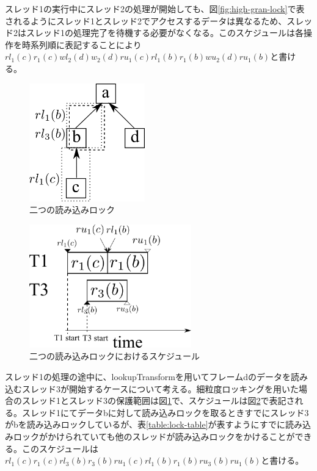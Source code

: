 \documentclass[a4paper]{jreport}	%
\begin{document}
スレッド1の実行中にスレッド2の処理が開始しても、図\ref{fig:high-gran-lock}で表されるようにスレッド1とスレッド2でアクセスするデータは異なるため、スレッド2はスレッド1の処理完了を待機する必要がなくなる。このスケジュールは各操作を時系列順に表記することにより$rl_1(c)r_1(c)wl_2(d)w_2(d)ru_1(c)rl_1(b)r_1(b)wu_2(d)ru_1(b)$と書ける。


\begin{figure}[h] 
\centering
\includegraphics[width=5cm]{two-read-lock}
\caption{二つの読み込みロック}
\label{fig:two-read-lock}
\end{figure}


\begin{figure}[h] 
\centering
\includegraphics[width=7cm]{two-read-lock-time}
\caption{二つの読み込みロックにおけるスケジュール}
\label{fig:two-read-lock-time}
\end{figure}

スレッド1の処理の途中に、lookupTransformを用いてフレームdのデータを読み込むスレッド3が開始するケースについて考える。細粒度ロッキングを用いた場合のスレッド1とスレッド3の保護範囲は図\ref{fig:two-read-lock}で、スケジュールは図\ref{fig:two-read-lock-time}で表記される。スレッド1にてデータbに対して読み込みロックを取るときすでにスレッド3がbを読み込みロックしているが、表\ref{table:lock-table}が表すようにすでに読み込みロックがかけられていても他のスレッドが読み込みロックをかけることができる。このスケジュールは$rl_1(c)r_1(c)rl_3(b)r_3(b)ru_1(c)rl_1(b)r_1(b)ru_3(b)ru_1(b)$と書ける。
\end{document}

